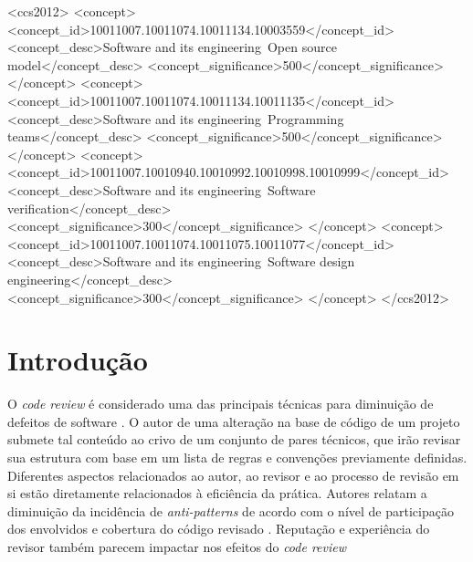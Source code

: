 \documentclass[sigconf]{acmart}
\begin{document}
\begin{CCSXML}
<ccs2012>
<concept>
<concept_id>10011007.10011074.10011134.10003559</concept_id>
<concept_desc>Software and its engineering~Open source model</concept_desc>
<concept_significance>500</concept_significance>
</concept>
<concept>
<concept_id>10011007.10011074.10011134.10011135</concept_id>
<concept_desc>Software and its engineering~Programming teams</concept_desc>
<concept_significance>500</concept_significance>
</concept>
<concept>
<concept_id>10011007.10010940.10010992.10010998.10010999</concept_id>
<concept_desc>Software and its engineering~Software verification</concept_desc>
<concept_significance>300</concept_significance>
</concept>
<concept>
<concept_id>10011007.10011074.10011075.10011077</concept_id>
<concept_desc>Software and its engineering~Software design engineering</concept_desc>
<concept_significance>300</concept_significance>
</concept>
</ccs2012>
\end{CCSXML}




\maketitle

\section{Introdução}

O \textit{code review} é considerado uma das principais técnicas para diminuição de defeitos de software \cite{Boehm2001}. O autor de uma alteração na base de código de um projeto submete tal conteúdo ao crivo de um conjunto de pares técnicos, que irão revisar sua estrutura com base em um lista de regras e convenções previamente definidas. Diferentes aspectos relacionados ao autor, ao revisor e ao processo de revisão em si estão diretamente relacionados à eficiência da prática. Autores relatam a diminuição da incidência de \textit{anti-patterns} \cite{Kemerer2009} de acordo com o nível de participação dos envolvidos e cobertura do código revisado \cite{Meneely201437, Morales2015171, Bavota201581}. Reputação \cite{Baysal2013122, Bosu2014} e experiência \cite{Kononenko2015111} do revisor também parecem impactar nos efeitos do \textit{code review}
\end{document}
